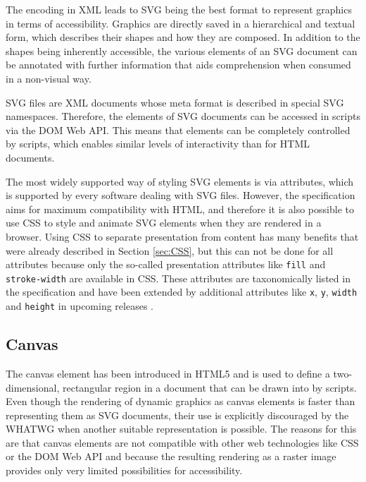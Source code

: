 The encoding in XML leads to SVG being the best format to represent graphics in terms of accessibility. Graphics are directly saved in a hierarchical and textual form, which describes their shapes and how they are composed. In addition to the shapes being inherently accessible, the various elements of an SVG document can be annotated with further information that aids comprehension when consumed in a non-visual way.

SVG files are XML documents whose meta format is described in special SVG namespaces. Therefore, the elements of SVG documents can be accessed in scripts via the DOM Web API. This means that elements can be completely controlled by scripts, which enables similar levels of interactivity than for HTML documents.

The most widely supported way of styling SVG elements is via attributes, which is supported by every software dealing with SVG files. However, the specification aims for maximum compatibility with HTML, and therefore it is also possible to use CSS to style and animate SVG elements when they are rendered in a browser. Using CSS to separate presentation from content has many benefits that were already described in Section \ref{sec:CSS}, but this can not be done for all attributes because only the so-called presentation attributes like \lstinline{fill} and \lstinline{stroke-width} are available in CSS. These attributes are taxonomically listed in the specification \parencite{CSS1.1} and have been extended by additional attributes like \lstinline{x}, \lstinline{y}, \lstinline{width} and \lstinline{height} in upcoming releases \parencite{CSS2}.

\subsection{Canvas}


The canvas element has been introduced in HTML5 \parencite{HTMLSpec} and is used to define a two-dimensional, rectangular region in a document that can be drawn into by scripts. Even though the rendering of dynamic graphics as canvas elements is faster than representing them as SVG documents, their use is explicitly discouraged by the WHATWG when another suitable representation is possible. The reasons for this are that canvas elements are not compatible with other web technologies like CSS or the DOM Web API and because the resulting rendering as a raster image provides only very limited possibilities for accessibility.

